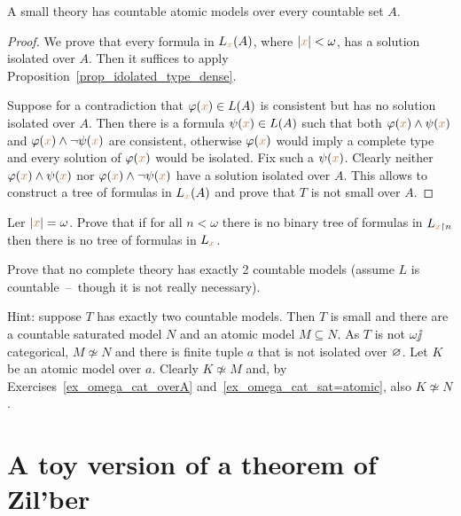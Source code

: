 \documentclass[creche.tex]{subfiles}
\begin{document}
\begin{proposition} 
A small theory has countable atomic models over every countable set $A$.
\end{proposition}
\begin{proof}
We prove that every formula in $L_{\color{brown} x}(A)$, where $|{\color{brown} x}|<\omega$, has a solution isolated over $A$. Then it suffices to apply Proposition~\ref{prop_idolated_type_dense}. 

Suppose for a contradiction that $\varphi({\color{brown} x})\in L(A)$ is consistent but has no solution isolated over $A$. Then there is a formula $\psi({\color{brown} x})\in L(A)$ such that both $\varphi({\color{brown} x})\wedge\psi({\color{brown} x})$ and $\varphi({\color{brown} x})\wedge\neg\psi({\color{brown} x})$ are consistent, otherwise $\varphi({\color{brown} x})$ would imply a complete type and every solution of $\varphi({\color{brown} x})$ would be isolated. Fix such a $\psi({\color{brown} x})$. Clearly neither $\varphi({\color{brown} x})\wedge\psi({\color{brown} x})$ nor $\varphi({\color{brown} x})\wedge\neg\psi({\color{brown} x})$ have a solution isolated over $A$. This allows to construct a tree of formulas in $L_{\color{brown} x}(A)$ and prove that $T$ is not small over $A$.
\end{proof}

\begin{exercise}
Ler $|{\color{brown} x}|=\omega$. Prove that if for all $n<\omega$ there is no binary tree of formulas in $L_{{\color{brown} x}\restriction n}$ then there is no tree of formulas in $L_{\color{brown} x}$.\QED
\end{exercise}


\begin{exercise}[(Vaught)]
Prove that no complete theory has exactly 2 countable models (assume $L$ is countable~--~though it is not really necessary).

Hint: suppose $T$ has exactly two countable models. Then $T$ is small and there are a countable saturated model $N$ and an atomic model $M\subseteq N$. As $T$ is not $\omega\jj$categorical, $M\not\simeq N$ and there is finite tuple $a$ that is not isolated over $\varnothing$. Let $K$ be an atomic model over $a$. Clearly $K\not\simeq M$ and, by Exercises~\ref{ex_omega_cat_overA} and~\ref{ex_omega_cat_sat=atomic}, also $K\not\simeq N$.\QED
\end{exercise}

\section{A toy version of a theorem of Zil'ber}
\end{document}
